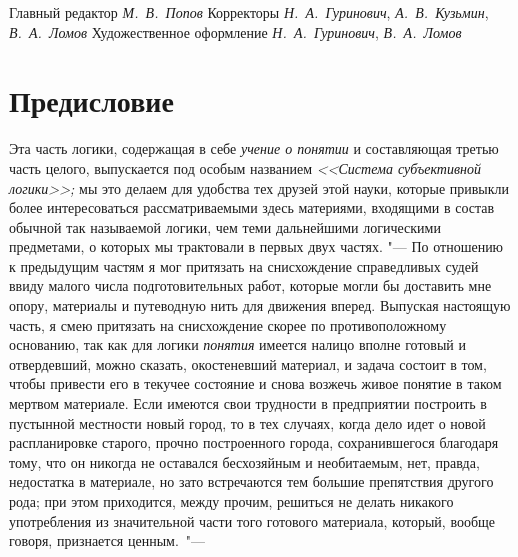 Главный редактор {\em М.~В.~Попов}
Корректоры {\em Н.~А.~Гуринович}, {\em А.~В.~Кузьмин}, {\em В.~А.~Ломов}
Художественное оформление {\em Н.~А.~Гуринович}, {\em В.~А.~Ломов}

\bigskip

\clearpage
\chapter[Предисловие]{Предисловие}
Эта часть логики, содержащая в себе {\em учение о понятии} и составляющая
третью часть целого, выпускается под особым названием {\em <<Система
субъективной логики>>;} мы это делаем для удобства тех друзей этой науки,
которые привыкли более интересоваться рассматриваемыми здесь материями,
входящими в состав обычной так называемой логики, чем теми дальнейшими
логическими предметами, о которых мы трактовали в первых двух частях. "---
По отношению к предыдущим частям я мог притязать на снисхождение
справедливых судей ввиду малого числа подготовительных работ, которые могли
бы доставить мне опору, материалы и путеводную нить для
движения вперед. Выпуская настоящую часть, я смею притязать на снисхождение
скорее по противоположному основанию, так как для логики {\em понятия} имеется
налицо вполне готовый и отвердевший, можно сказать, окостеневший материал,
и задача состоит в том, чтобы привести его в текучее состояние и снова
возжечь живое понятие в таком мертвом материале. Если имеются свои
трудности в предприятии построить в пустынной местности новый город, то в
тех случаях, когда дело идет о новой распланировке старого, прочно
построенного города, сохранившегося благодаря тому, что он никогда не
оставался бесхозяйным и необитаемым, нет, правда, недостатка в материале,
но зато встречаются тем большие препятствия другого рода; при этом
приходится, между прочим, решиться не делать никакого употребления из
значительной части того готового материала, который, вообще говоря,
признается ценным.~"---


